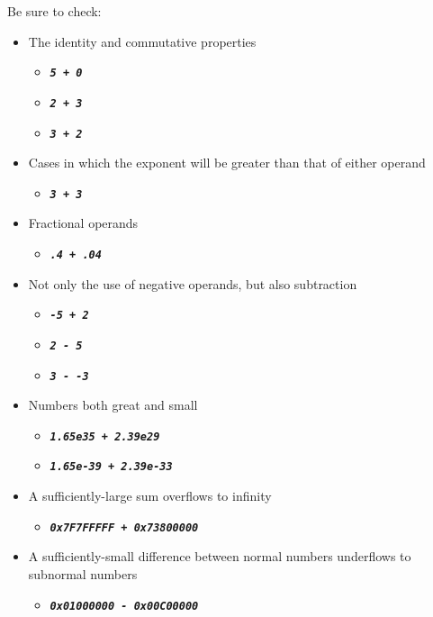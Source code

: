 Be sure to check:
\begin{itemize}
    \item The identity and commutative properties
    \begin{itemize}
        \item[] \texttt{\textbf{\textit{5 + 0}}}
        \item[] \texttt{\textbf{\textit{2 + 3}}}
        \item[] \texttt{\textbf{\textit{3 + 2}}}
    \end{itemize}
    \item Cases in which the exponent will be greater than that of either operand
    \begin{itemize}
        \item[] \texttt{\textbf{\textit{3 + 3}}}
    \end{itemize}
    \item Fractional operands
    \begin{itemize}
        \item[] \texttt{\textbf{\textit{.4 + .04}}}
    \end{itemize}
    \item Not only the use of negative operands, but also subtraction
    \begin{itemize}
        \item[] \texttt{\textbf{\textit{-5 + 2}}}
        \item[] \texttt{\textbf{\textit{2 - 5}}}
        \item[] \texttt{\textbf{\textit{3 - -3}}}
    \end{itemize}
    \item Numbers both great and small
    \begin{itemize}
        \item[] \texttt{\textbf{\textit{1.65e35 + 2.39e29}}}
        \item[] \texttt{\textbf{\textit{1.65e-39 + 2.39e-33}}}
    \end{itemize}
    \item A sufficiently-large sum overflows to infinity
    \begin{itemize}
        \item[] \texttt{\textbf{\textit{0x7F7FFFFF + 0x73800000}}}
    \end{itemize}
    \item A sufficiently-small difference between normal numbers underflows to subnormal numbers
    \begin{itemize}
        \item[] \texttt{\textbf{\textit{0x01000000 - 0x00C00000}}}

\end{itemize}
\end{itemize}
